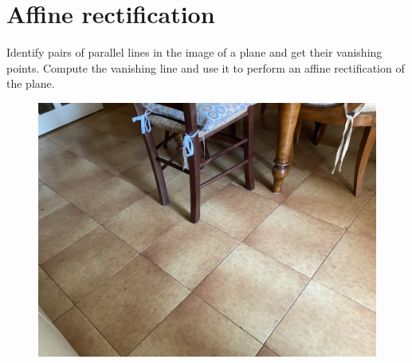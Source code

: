 \documentclass[12pt, a4paper]{report}
\begin{document}
    \section{Affine rectification}
        Identify pairs of parallel lines in the image of a plane and get their vanishing points. Compute the vanishing line and use it to perform an affine rectification of 
        the plane.
        \begin{figure}[H]
            \centering
            \includegraphics[width=0.75\linewidth]{images/floor.png}
        \end{figure}
\end{document}
